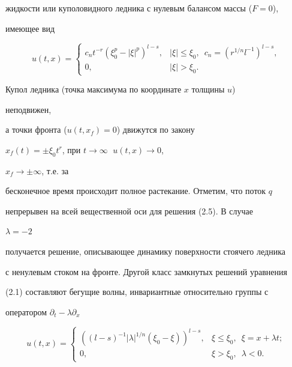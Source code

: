 жидкости или куполовидного ледника с нулевым балансом массы ($F=0$),


имеющее вид


\begin{equation}


u(t,x)=


\begin{cases}


c_nt^{-r}(\xi^p_0-|\xi|^p)^{l-s}, & |\xi|\le\xi_0, \ \;


c_n=(r^{1/n}l^{-1})^{l-s},\\


0, & |\xi|>\xi_0.


\end{cases}


\tag{2.5}


\end{equation}


Купол ледника (точка максимума по координате $x$ толщины $u$)


неподвижен,


а точки фронта ($u(t,x_f)=0$) движутся по закону


$x_f(t)=\pm\xi_0t^r$, при $t\to\infty\;$ $u(t,x)\to 0$,


$x_f\to\pm\infty$, т.е. за


бесконечное время происходит полное растекание. Отметим, что поток $q$


непрерывен на всей вещественной оси для решения (2.5). В случае


$\lambda=-2$


получается решение, описывающее динамику поверхности стоячего ледника


с ненулевым стоком на фронте. Другой класс замкнутых решений уравнения


(2.1) составляют бегущие волны, инвариантные относительно группы с


оператором $\partial_t-\lambda\partial_x$


\begin{equation}


u(t,x)=


\begin{cases}


((l-s)^{-1}|\lambda|^{1/n}(\xi_0-\xi))^{l-s}, & \xi\le\xi_0,\ \;


\xi=x+\lambda t;\\


0, & \xi>\xi_0,\ \;\lambda<0.


\end{cases}


\tag{2.6}


\end{equation}



